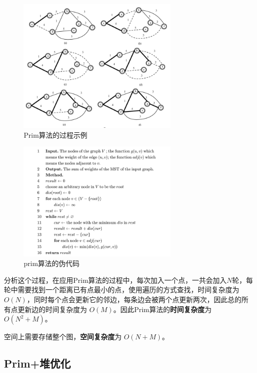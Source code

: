 \documentclass[UTF8]{ctexart}
\begin{document}
\begin{figure}[htbp]
    \centering
    \includegraphics[width=0.7\textwidth]{assets/prim.png}
    \caption{Prim算法的过程示例}
    \label{fig:prim}
\end{figure}\cite{贺军忠2020kruskal}
\begin{figure}[htbp]
    \centering
    \includegraphics[width=0.7\textwidth]{assets/prim_pcode.png}
    \caption{prim算法的伪代码}
    \label{fig:prim_pcode}
\end{figure}

分析这个过程，在应用Prim算法的过程中，每次加入一个点，一共会加入$N$轮，每轮中需要找到一个距离已有点最小的点，使用遍历的方式查找，时间复杂度为 $O(N)$，同时每个点会更新它的邻边，每条边会被两个点更新两次，因此总的所有点更新边的时间复杂度为 $O(M)$。因此Prim算法的\textbf{时间复杂度}为 $O(N^2+M)$。

空间上需要存储整个图，\textbf{空间复杂度}为 $O(N+M)$。

\subsection{Prim+堆优化}
\end{document}
